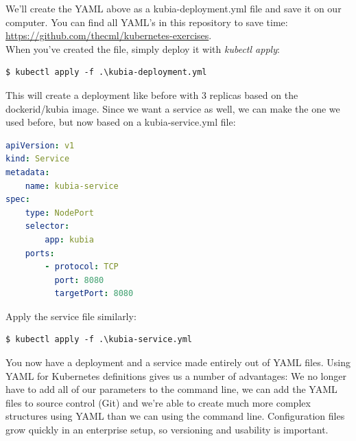 \documentclass[a4paper,10pt]{article}
\begin{document}
We'll create the YAML above as a kubia-deployment.yml file and save it on our computer. You can find all YAML's in this repository to save time: \url{https://github.com/thecml/kubernetes-exercises}. \\

When you've created the file, simply deploy it with \textit{kubectl apply}:

\begin{lstlisting}[numbers=none, basicstyle=\ttfamily]
$ kubectl apply -f .\kubia-deployment.yml
\end{lstlisting}

This will create a deployment like before with 3 replicas based on the dockerid/kubia image. Since we want a service as well, we can make the one we used before, but now based on a kubia-service.yml file:

\begin{lstlisting}[language=yaml, numbers=none, frame=single]
apiVersion: v1
kind: Service
metadata:
	name: kubia-service
spec:
	type: NodePort
	selector:
		app: kubia
	ports:
		- protocol: TCP
		  port: 8080
		  targetPort: 8080
\end{lstlisting}

Apply the service file similarly:

\begin{lstlisting}[numbers=none, basicstyle=\ttfamily]
$ kubectl apply -f .\kubia-service.yml
\end{lstlisting}

You now have a deployment and a service made entirely out of YAML files. Using YAML for Kubernetes definitions gives us a number of advantages: We no longer have to add all of our parameters to the command line, we can add the YAML files to source control (Git) and we're able to create much more complex structures using YAML than we can using the command line. Configuration files grow quickly in an enterprise setup, so versioning and usability is important.
\end{document}
